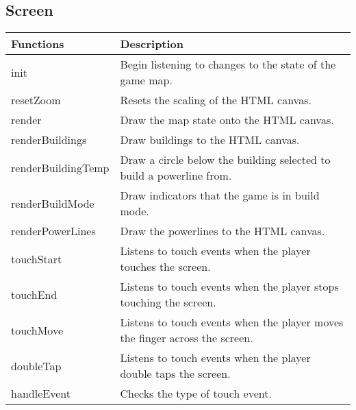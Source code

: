 \subsection*{Screen}

	\begin{table}[H]
	\begin{tabular}{p{4cm} | p{8cm} }
	\hline
	\rowcolor{gray}
	Functions & Description \\ \hline
	init & Begin listening to changes to the state of the game map. \\ \hline
	resetZoom & Resets the scaling of the HTML canvas. \\ \hline
	render & Draw the map state onto the HTML canvas. \\ \hline
	renderBuildings & Draw buildings to the HTML canvas. \\ \hline
	renderBuildingTemp & Draw a circle below the building selected to build a powerline from. \\ \hline
	renderBuildMode & Draw indicators that the game is in build mode. \\ \hline
	renderPowerLines & Draw the powerlines to the HTML canvas. \\ \hline
  	touchStart & Listens to touch events when the player touches the screen.\\ \hline
  	touchEnd & Listens to touch events when the player stops touching the screen.\\ \hline
  	touchMove & Listens to touch events when the player moves the finger across the screen.\\ \hline
  	doubleTap & Listens to touch events when the player double taps the screen.\\ \hline
  	handleEvent & Checks the type of touch event.\\ \hline
	\end{tabular}
	\end{table}

